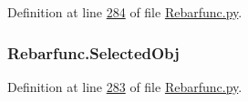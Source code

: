 Definition at line \hyperlink{Rebarfunc_8py_source_l00284}{284} of file \hyperlink{Rebarfunc_8py_source}{Rebarfunc.\+py}.

\subsubsection[{\texorpdfstring{Selected\+Obj}{SelectedObj}}]{\setlength{\rightskip}{0pt plus 5cm}Rebarfunc.\+Selected\+Obj}\hypertarget{namespaceRebarfunc_aca3582a1ad0a9350ca59d02fd3188f80}{}\label{namespaceRebarfunc_aca3582a1ad0a9350ca59d02fd3188f80}


Definition at line \hyperlink{Rebarfunc_8py_source_l00283}{283} of file \hyperlink{Rebarfunc_8py_source}{Rebarfunc.\+py}.

